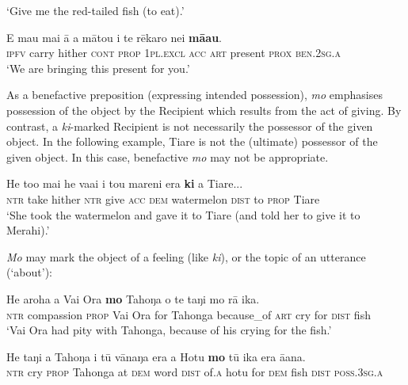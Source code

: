 \glt 
‘Give me the red-tailed fish (to eat).’ \textstyleExampleref{[Mtx-5-04.014]}
\z

\ea\label{ex:8.180}
\gll E ma{\ꞌ}u mai {\ꞌ}ā a mātou i te rēkaro nei \textbf{mā{\ꞌ}au}. \\
\textsc{ipfv} carry hither \textsc{cont} \textsc{prop} \textsc{1pl.excl} \textsc{acc} \textsc{art} present \textsc{prox} \textsc{ben.2sg.a} \\

\glt
‘We are bringing this present for you.’ \textstyleExampleref{[R210.127]} 
\z

As a benefactive preposition (expressing intended possession), \textit{mo} emphasises possession of the object by the Recipient which results from the act of giving. By contrast, a \textit{ki}{}-marked Recipient is not necessarily the possessor of the given object. In the following example, Tiare is not the (ultimate) possessor of the given object. In this case, benefactive \textit{mo} may not be appropriate.

\ea\label{ex:8.181}
\gll He to{\ꞌ}o mai he va{\ꞌ}ai i tou mareni era \textbf{ki} a Tiare... \\
\textsc{ntr} take hither \textsc{ntr} give \textsc{acc} \textsc{dem} watermelon \textsc{dist} to \textsc{prop} Tiare \\

\glt
‘She took the watermelon and gave it to Tiare (and told her to give it to Merahi).’ \textstyleExampleref{[R309.072]} 
\z

\textit{Mo} may mark the object of a feeling (like \textit{ki}), or the topic of an utterance (‘about’):

\ea\label{ex:8.182}
\gll He {\ꞌ}aroha a Vai Ora \textbf{mo} Tahoŋa {\ꞌ}o te taŋi mo rā ika.\\
\textsc{ntr} compassion \textsc{prop} Vai Ora for Tahonga because\_of \textsc{art} cry for \textsc{dist} fish\\

\glt 
‘Vai Ora had pity with Tahonga, because of his crying for the fish.’ \textstyleExampleref{[R301.249]} 
\z

\largerpage
\ea\label{ex:8.183}
\gll He taŋi a Tahoŋa {\ꞌ}i tū vānaŋa era {\ꞌ}a Hotu \textbf{mo} tū ika era {\ꞌ}ā{\ꞌ}ana. \\
\textsc{ntr} cry \textsc{prop} Tahonga at \textsc{dem} word \textsc{dist} of\textsc{.a} hotu for \textsc{dem} fish \textsc{dist} \textsc{poss.3sg.a} \\

